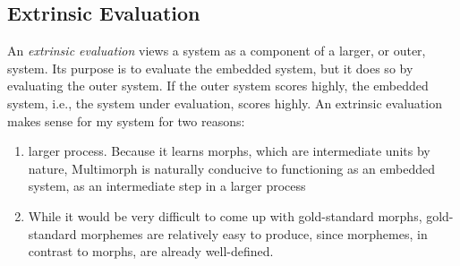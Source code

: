 \subsection{Extrinsic Evaluation} \label{sec:eval-extrinsic} An \emph{extrinsic evaluation} 
views a system as a component of a larger, or outer, system. 
Its purpose is to evaluate the embedded system, but it does so by evaluating the outer 
system. If the outer system scores highly,
the embedded system, i.e., the system under evaluation, scores highly.
An extrinsic evaluation makes sense for my system for two reasons:
\begin{enumerate}
\item 
larger process. Because it learns morphs, which are intermediate units by nature, Multimorph is naturally conducive to functioning as an embedded system, as an intermediate step in a larger process
\item While it would be very difficult to come up with gold-standard morphs, gold-standard morphemes are relatively easy to produce, since morphemes, in contrast to morphs, are already well-defined. 
\end{enumerate}


 

